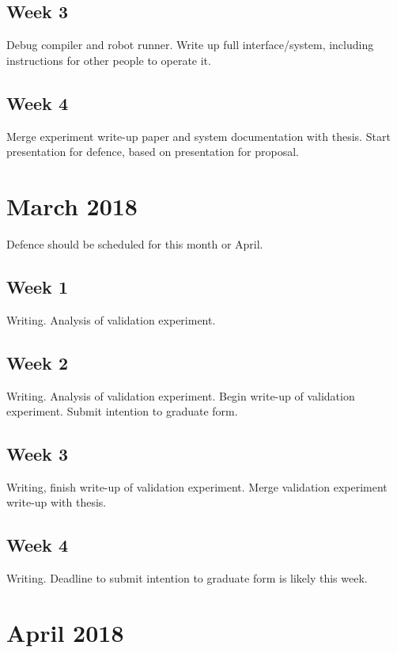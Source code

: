 \subsection{Week 3}

Debug compiler and robot runner. 
Write up full interface/system, including instructions for other people to operate it. 

\subsection{Week 4}

Merge experiment write-up paper and system documentation with thesis.
Start presentation for defence, based on presentation for proposal. 

\section{March 2018}

Defence should be scheduled for this month or April. 

\subsection{Week 1}

Writing.
Analysis of validation experiment. 

\subsection{Week 2}

Writing.
Analysis of validation experiment. 
Begin write-up of validation experiment. 
Submit intention to graduate form. 

\subsection{Week 3}

Writing, finish write-up of validation experiment. Merge validation experiment write-up with thesis. 

\subsection{Week 4}

Writing. 
Deadline to submit intention to graduate form is likely this week. 

\section{April 2018}

